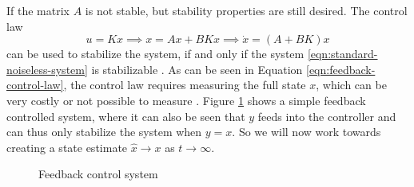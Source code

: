 If the matrix $A$ is not stable, but stability properties are still desired. The control law
\begin{equation}\label{eqn:feedback-control-law}
    u = Kx \implies x = Ax + BKx \implies \dot{x} = (A+BK)x
\end{equation}
can be used to stabilize the system, if and only if the system \eqref{eqn:standard-noiseless-system} is stabilizable \cite[Theorem 14.5]{Hespanha2018LinearTheory}. As can be seen in Equation \eqref{eqn:feedback-control-law}, the control law requires measuring the full state $x$, which can be very costly or not possible to measure \cite{yappa}. Figure \ref{fig:feedback-diagram} shows a simple feedback controlled system, where it can also be seen that $y$ feeds into the controller and can thus only stabilize the system when $y=x$. So we will now work towards creating a state estimate $\hat{x} \rightarrow x$ as $t \rightarrow \infty$.

\begin{figure}[H]
    \centering
    \caption{Feedback control system}
    \label{fig:feedback-diagram}
\end{figure}
 
